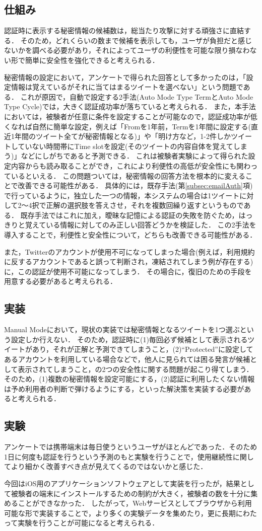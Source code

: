 \subsection{仕組み}
認証時に表示する秘密情報の候補数は，総当たり攻撃に対する頑強さに直結する．
そのため，どれくらいの数まで候補を表示しても，ユーザが負担だと感じないかを調べる必要があり，それによってユーザの利便性を可能な限り損なわない形で簡単に安全性を強化できると考えられる．

秘密情報の設定において，アンケートで得られた回答として多かったのは，「設定情報は覚えているがそれに当てはまるツイートを選べない」という問題である．
これが原因で，自動で設定する2手法(Auto Mode Type TermとAuto Mode Type Cycle)では，大きく認証成功率が落ちていると考えられる．
また，本手法においては，被験者が任意に条件を設定することが可能なので，認証成功率が低くなれば自然に簡単な設定，例えば「Fromを1年前，Termを1年間に設定する(直近1年間のツイート全てが秘密情報となる)」や「明け方など，1-2件しかツイートしていない時間帯にTime slotを設定(そのツイートの内容自体を覚えてしまう)」などにしがちであると予測できる．
これは被験者実験によって得られた設定内容からも読み取ることができ，これにより利便性の高低が安全性にも関わっているといえる．
この問題ついては，秘密情報の回答方法を根本的に変えることで改善できる可能性がある．
具体的には，既存手法(第\ref{subsec:emailAuth}項)で行っているように，独立した一つの情報，本システムの場合は1ツイートに対して2〜4択で正解の選択肢を答えさせ，それを複数回繰り返すというものである．
既存手法ではこれに加え，曖昧な記憶による認証の失敗を防ぐため，はっきりと覚えている情報に対してのみ正しい回答どうかを検証した．
この2手法を導入することで，利便性と安全性について，どちらも改善できる可能性がある．

また，Twitterのアカウントが使用不可になってしまった場合(例えば，利用規約に反するアカウントであると誤って判断され，凍結されてしまう例が存在する)に，この認証が使用不可能になってしまう．
その場合に，復旧のための手段を用意する必要があると考えられる．

\subsection{実装}
Manual Modeにおいて，現状の実装では秘密情報となるツイートを1つ選ぶという設定しか行えない．
そのため，認証時に(1)毎回必ず候補として表示されるツイートがあり，それが正解と予測できてしまうこと，(2)``Protected''に設定してあるアカウントを利用している場合などで，他人に見られては困る発言が候補として表示されてしまうこと，の2つの安全性に関する問題が起こり得てしまう．
そのため，(1)複数の秘密情報を設定可能にする，(2)認証に利用したくない情報は予め利用者の判断で弾けるようにする，といった解決策を実装する必要があると考えられる．

\subsection{実験}
アンケートでは携帯端末は毎日使うというユーザがほとんどであった．そのため1日に何度も認証を行うという予測のもと実験を行うことで，使用継続性に関してより細かく改善すべき点が見えてくるのではないかと感じた．

今回はiOS用のアプリケーションソフトウェアとして実装を行ったが，結果として被験者の端末にインストールするための制約が大きく，被験者の数を十分に集めることができなかった．
したがって，Webサービスとしてブラウザから利用可能な形で実装することで，より多くの実験データを集めたり，更に長期にわたって実験を行うことが可能になると考えられる．

\newpage

